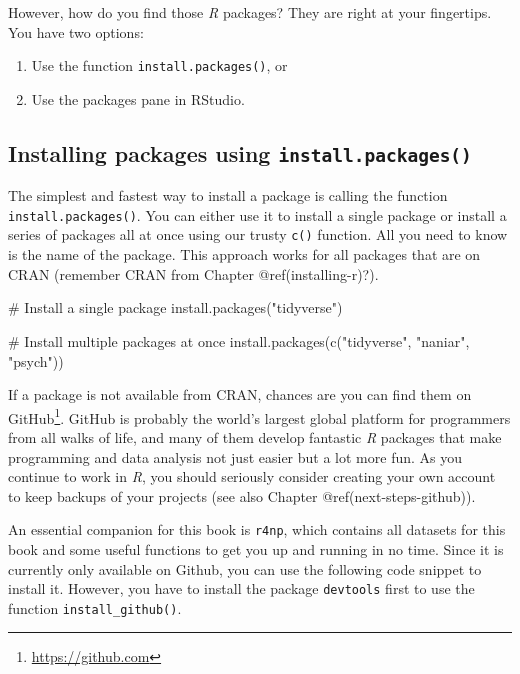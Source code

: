 \documentclass[
  letterpaper,
]{krantz}
\makeatletter
\newenvironment{Shaded}{\begin{snugshade}}{\end{snugshade}}
\newcommand{\CommentTok}[1]{\textcolor[rgb]{0.37,0.37,0.37}{#1}}
\newcommand{\FunctionTok}[1]{\textcolor[rgb]{0.28,0.35,0.67}{#1}}
\newcommand{\NormalTok}[1]{\textcolor[rgb]{0.00,0.23,0.31}{#1}}
\newcommand{\StringTok}[1]{\textcolor[rgb]{0.13,0.47,0.30}{#1}}
\renewcommand{\href}[2]{#2\footnote{\url{#1}}}
\newenvironment{kframe}{%
\medskip{}
\setlength{\fboxsep}{.8em}
 \def\at@end@of@kframe{}%
 \ifinner\ifhmode%
  \def\at@end@of@kframe{\end{minipage}}%
  \begin{minipage}{\columnwidth}%
 \fi\fi%
 \def\FrameCommand##1{\hskip\@totalleftmargin \hskip-\fboxsep
 \colorbox{shadecolor}{##1}\hskip-\fboxsep
     \hskip-\linewidth \hskip-\@totalleftmargin \hskip\columnwidth}%
 \MakeFramed {\advance\hsize-\width
   \@totalleftmargin\z@ \linewidth\hsize
   \@setminipage}}%
 {\par\unskip\endMakeFramed%
 \at@end@of@kframe}
\renewenvironment{Shaded}{\begin{kframe}}{\end{kframe}}
\makeatother
\begin{document}
However, how do you find those \emph{R} packages? They are right at your
fingertips. You have two options:

\begin{enumerate}
\def\labelenumi{\arabic{enumi}.}
\item
  Use the function \texttt{install.packages()}, or
\item
  Use the packages pane in RStudio.
\end{enumerate}

\subsection{\texorpdfstring{Installing packages using
\texttt{install.packages()}}{Installing packages using install.packages()}}\label{installing-packages-using-a-function}

The simplest and fastest way to install a package is calling the
function \texttt{install.packages()}. You can either use it to install a
single package or install a series of packages all at once using our
trusty \texttt{c()} function. All you need to know is the name of the
package. This approach works for all packages that are on CRAN (remember
CRAN from Chapter @ref(installing-r)?).

\begin{Shaded}
\begin{Highlighting}[]
\CommentTok{\# Install a single package}
\FunctionTok{install.packages}\NormalTok{(}\StringTok{"tidyverse"}\NormalTok{)}

\CommentTok{\# Install multiple packages at once}
\FunctionTok{install.packages}\NormalTok{(}\FunctionTok{c}\NormalTok{(}\StringTok{"tidyverse"}\NormalTok{, }\StringTok{"naniar"}\NormalTok{, }\StringTok{"psych"}\NormalTok{))}
\end{Highlighting}
\end{Shaded}

If a package is not available from CRAN, chances are you can find them
on \href{https://github.com}{GitHub}. GitHub is probably the world's
largest global platform for programmers from all walks of life, and many
of them develop fantastic \emph{R} packages that make programming and
data analysis not just easier but a lot more fun. As you continue to
work in \emph{R}, you should seriously consider creating your own
account to keep backups of your projects (see also Chapter
@ref(next-steps-github)).

An essential companion for this book is \texttt{r4np}, which contains
all datasets for this book and some useful functions to get you up and
running in no time. Since it is currently only available on Github, you
can use the following code snippet to install it. However, you have to
install the package \texttt{devtools} first to use the function
\texttt{install\_github()}.
\end{document}
